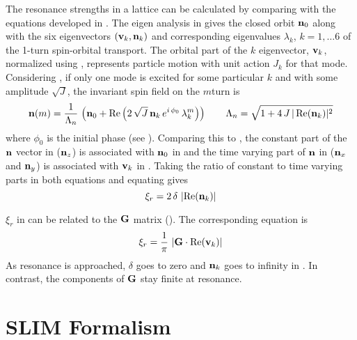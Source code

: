 The resonance strengths in a lattice can be calculated by comparing  with the equations
developed in . The eigen analysis in  gives the closed orbit
${\bf n}_0$ along with the six eigenvectors $({\bf v}_k, {\bf n}_k)$ and corresponding eigenvalues
$\lambda_k$, $k = 1, \ldots 6$ of the 1-turn spin-orbital transport. The orbital part of the $k$\Th
eigenvector, ${\bf v}_k$, normalized using , represents particle motion with unit action $J_k$
for that mode. Considering , if only one mode is excited for some particular $k$ and with
some amplitude $\sqrt{J}$, the invariant spin field on the $m$\Th turn is
\begin{equation}
  {\bf n}(m) = \frac{1}{\Lambda_n} \, 
  \left( {\bf n}_0 + \operatorname{Re} \left( 2 \, \sqrt{J} \, {\bf n}_k \, e^{i \, \phi_0} \, \lambda_k^m \right) \right)
  \qquad
  \Lambda_n = \sqrt{1 + 4 \, J \, |\operatorname{Re}({\bf n}_k)|^2}
  \label{nnav}
\end{equation}
where $\phi_0$ is the initial phase (see ). Comparing this to , the constant part
of the ${\bf n}$ vector in  (${\bf n}_z$) is associated with ${\bf n}_0$ in  and the time
varying part of ${\bf n}$ in  (${\bf n}_x$ and ${\bf n}_y$) is associated with ${\bf v}_k$ in
. Taking the ratio of constant to time varying parts in both equations and equating gives
\begin{equation}
  \xi_r = 2 \, \delta \, \left| \operatorname{Re}({\bf n}_k) \right|
  \label{x2dn}
\end{equation}

$\xi_r$ in  can be related to the ${\bf G}$ matrix (). The corresponding equation
is\cite{b:spin.hoff}
\begin{equation}
  \xi_r = \frac{1}{\pi} \, \left| {\bf G} \cdot \operatorname{Re}({\bf v}_k) \right|
  \label{x1pg}
\end{equation}
As resonance is approached, $\delta$ goes to zero and ${\bf n}_k$ goes to infinity in . In
contrast, the components of ${\bf G}$ stay finite at resonance.




\section{SLIM Formalism}
\label{s:slim}


